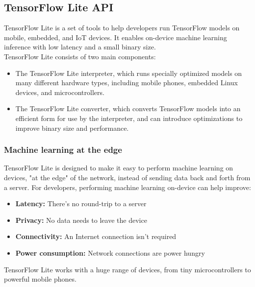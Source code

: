 \documentclass[14pt]{report}
\begin{document}
			\subsection{TensorFlow Lite API}
				TensorFlow Lite is a set of tools to help developers run TensorFlow models on mobile, embedded, and IoT devices. It enables on-device machine learning inference with low latency and a small binary size.\\

				TensorFlow Lite consists of two main components:
				\begin{itemize}
					\item The TensorFlow Lite interpreter, which runs specially optimized models on many different hardware types, including mobile phones, embedded Linux devices, and microcontrollers.
					\item The TensorFlow Lite converter, which converts TensorFlow models into an efficient form for use by the interpreter, and can introduce optimizations to improve binary size and performance.
				\end{itemize}

				\subsubsection{Machine learning at the edge}
					TensorFlow Lite is designed to make it easy to perform machine learning on devices, "at the edge" of the network, instead of sending data back and forth from a server. For developers, performing machine learning on-device can help improve:
					\begin{itemize}
						\item \textbf{Latency:} There's no round-trip to a server
						\item \textbf{Privacy:} No data needs to leave the device
						\item \textbf{Connectivity:} An Internet connection isn't required
						\item \textbf{Power consumption:} Network connections are power hungry
					\end{itemize}

					TensorFlow Lite works with a huge range of devices, from tiny microcontrollers to powerful mobile phones.
\end{document}
